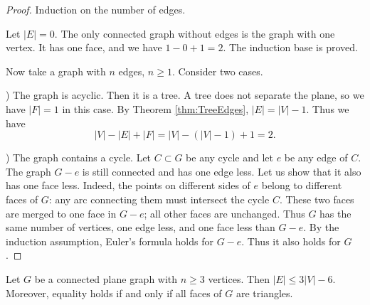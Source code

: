 \begin{page}
\setcounter{section}{3}
\setcounter{subsection}{2}
\setcounter{dfn}{8}
\label{portion:300}


\begin{proof}
Induction on the number of edges.

Let $|E| = 0$. The only connected graph without edges is the graph with one vertex.
It has one face, and we have $1 - 0 + 1 = 2$. The induction base is proved.

Now take a graph with $n$ edges, $n \ge 1$.
Consider two cases.

) The graph is acyclic.
Then it is a tree. A tree does not separate the plane, so we have $|F| = 1$ in this case.
By Theorem \ref{thm:TreeEdges}, $|E| = |V|-1$.
Thus we have
\[
|V| - |E| + |F| = |V| - (|V|-1) + 1 = 2.
\]

) The graph contains a cycle.
Let $C \subset G$ be any cycle and let $e$ be any edge of $C$.
The graph $G - e$ is still connected and has one edge less.
Let us show that it also has one face less.
Indeed, the points on different sides of $e$ belong to different faces of $G$:
any arc connecting them must intersect the cycle $C$.
These two faces are merged to one face in $G - e$; all other faces are unchanged.
Thus $G$ has the same number of vertices, one edge less, and one face less than $G - e$.
By the induction assumption, Euler's formula holds for $G - e$.
Thus it also holds for $G$.
\end{proof}



\end{page}

\begin{page}
\setcounter{section}{3}
\setcounter{subsection}{2}
\setcounter{dfn}{9}
\label{portion:302}

\begin{thm}
\label{thm:3V-6}
Let $G$ be a connected plane graph with $n \ge 3$ vertices.
Then $|E| \le 3|V| - 6$.
Moreover, equality holds if and only if all faces of $G$ are triangles.
\end{thm}

\end{page}


